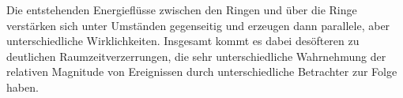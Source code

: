 \begin{newstuff}
        Die entstehenden Energieflüsse zwischen den Ringen und über die Ringe verstärken sich unter Umständen gegenseitig und erzeugen dann parallele, aber unterschiedliche Wirklichkeiten. Insgesamt kommt es dabei desöfteren zu deutlichen Raumzeitverzerrungen, die sehr unterschiedliche Wahrnehmung der relativen Magnitude von Ereignissen durch unterschiedliche Betrachter zur Folge haben.
    \end{newstuff}